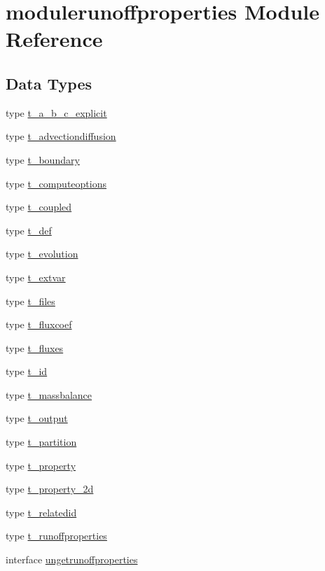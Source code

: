 \hypertarget{namespacemodulerunoffproperties}{}\section{modulerunoffproperties Module Reference}
\label{namespacemodulerunoffproperties}
\subsection*{Data Types}
\begin{DoxyCompactItemize}
\item 
type \mbox{\hyperlink{structmodulerunoffproperties_1_1t__a__b__c__explicit}{t\+\_\+a\+\_\+b\+\_\+c\+\_\+explicit}}
\item 
type \mbox{\hyperlink{structmodulerunoffproperties_1_1t__advectiondiffusion}{t\+\_\+advectiondiffusion}}
\item 
type \mbox{\hyperlink{structmodulerunoffproperties_1_1t__boundary}{t\+\_\+boundary}}
\item 
type \mbox{\hyperlink{structmodulerunoffproperties_1_1t__computeoptions}{t\+\_\+computeoptions}}
\item 
type \mbox{\hyperlink{structmodulerunoffproperties_1_1t__coupled}{t\+\_\+coupled}}
\item 
type \mbox{\hyperlink{structmodulerunoffproperties_1_1t__def}{t\+\_\+def}}
\item 
type \mbox{\hyperlink{structmodulerunoffproperties_1_1t__evolution}{t\+\_\+evolution}}
\item 
type \mbox{\hyperlink{structmodulerunoffproperties_1_1t__extvar}{t\+\_\+extvar}}
\item 
type \mbox{\hyperlink{structmodulerunoffproperties_1_1t__files}{t\+\_\+files}}
\item 
type \mbox{\hyperlink{structmodulerunoffproperties_1_1t__fluxcoef}{t\+\_\+fluxcoef}}
\item 
type \mbox{\hyperlink{structmodulerunoffproperties_1_1t__fluxes}{t\+\_\+fluxes}}
\item 
type \mbox{\hyperlink{structmodulerunoffproperties_1_1t__id}{t\+\_\+id}}
\item 
type \mbox{\hyperlink{structmodulerunoffproperties_1_1t__massbalance}{t\+\_\+massbalance}}
\item 
type \mbox{\hyperlink{structmodulerunoffproperties_1_1t__output}{t\+\_\+output}}
\item 
type \mbox{\hyperlink{structmodulerunoffproperties_1_1t__partition}{t\+\_\+partition}}
\item 
type \mbox{\hyperlink{structmodulerunoffproperties_1_1t__property}{t\+\_\+property}}
\item 
type \mbox{\hyperlink{structmodulerunoffproperties_1_1t__property__2d}{t\+\_\+property\+\_\+2d}}
\item 
type \mbox{\hyperlink{structmodulerunoffproperties_1_1t__relatedid}{t\+\_\+relatedid}}
\item 
type \mbox{\hyperlink{structmodulerunoffproperties_1_1t__runoffproperties}{t\+\_\+runoffproperties}}
\item 
interface \mbox{\hyperlink{interfacemodulerunoffproperties_1_1ungetrunoffproperties}{ungetrunoffproperties}}
\end{DoxyCompactItemize}
